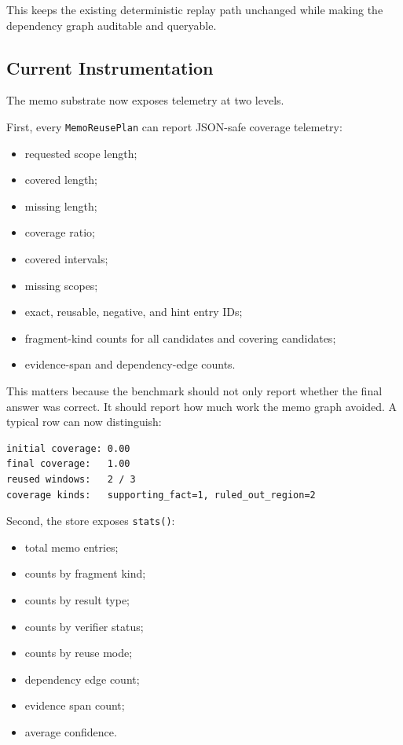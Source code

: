 \documentclass[11pt]{article}
\begin{document}
This keeps the existing deterministic replay path unchanged while making the
dependency graph auditable and queryable.

\subsection{Current Instrumentation}

The memo substrate now exposes telemetry at two levels.

First, every \texttt{MemoReusePlan} can report JSON-safe coverage telemetry:

\begin{itemize}[leftmargin=*]
    \item requested scope length;
    \item covered length;
    \item missing length;
    \item coverage ratio;
    \item covered intervals;
    \item missing scopes;
    \item exact, reusable, negative, and hint entry IDs;
    \item fragment-kind counts for all candidates and covering candidates;
    \item evidence-span and dependency-edge counts.
\end{itemize}

This matters because the benchmark should not only report whether the final
answer was correct. It should report how much work the memo graph avoided. A
typical row can now distinguish:

\begin{verbatim}
initial coverage: 0.00
final coverage:   1.00
reused windows:   2 / 3
coverage kinds:   supporting_fact=1, ruled_out_region=2
\end{verbatim}

Second, the store exposes \texttt{stats()}:

\begin{itemize}[leftmargin=*]
    \item total memo entries;
    \item counts by fragment kind;
    \item counts by result type;
    \item counts by verifier status;
    \item counts by reuse mode;
    \item dependency edge count;
    \item evidence span count;
    \item average confidence.
\end{itemize}
\end{document}

